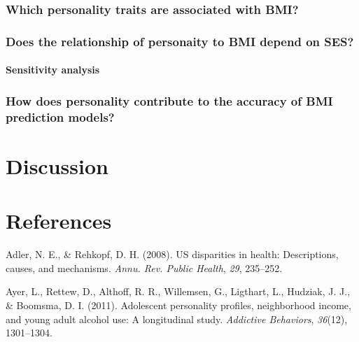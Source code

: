 \documentclass[man]{apa6}
\let\oldparagraph\paragraph
\renewcommand{\paragraph}[1]{\oldparagraph{#1}\mbox{}}
\begin{document}
\hypertarget{which-personality-traits-are-associated-with-bmi}{%
\subsubsection{Which personality traits are associated with BMI?}\label{which-personality-traits-are-associated-with-bmi}}

\hypertarget{does-the-relationship-of-personaity-to-bmi-depend-on-ses-1}{%
\subsubsection{Does the relationship of personaity to BMI depend on SES?}\label{does-the-relationship-of-personaity-to-bmi-depend-on-ses-1}}

\hypertarget{sensitivity-analysis-1}{%
\paragraph{Sensitivity analysis}\label{sensitivity-analysis-1}}

\hypertarget{how-does-personality-contribute-to-the-accuracy-of-bmi-prediction-models-1}{%
\subsubsection{How does personality contribute to the accuracy of BMI prediction models?}\label{how-does-personality-contribute-to-the-accuracy-of-bmi-prediction-models-1}}

\hypertarget{discussion}{%
\section{Discussion}\label{discussion}}

\newpage

\hypertarget{references}{%
\section{References}\label{references}}

\begingroup
\setlength{\parindent}{-0.5in}
\setlength{\leftskip}{0.5in}

\hypertarget{refs}{}
\leavevmode\hypertarget{ref-adler2008us}{}%
Adler, N. E., \& Rehkopf, D. H. (2008). US disparities in health: Descriptions, causes, and mechanisms. \emph{Annu. Rev. Public Health}, \emph{29}, 235--252.

\leavevmode\hypertarget{ref-ayer2011adolescent}{}%
Ayer, L., Rettew, D., Althoff, R. R., Willemsen, G., Ligthart, L., Hudziak, J. J., \& Boomsma, D. I. (2011). Adolescent personality profiles, neighborhood income, and young adult alcohol use: A longitudinal study. \emph{Addictive Behaviors}, \emph{36}(12), 1301--1304.
\end{document}
